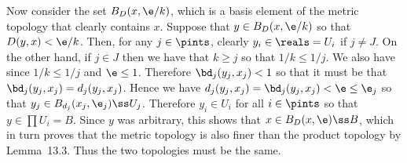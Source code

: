 {{    Now consider the set $B_D(x,\e/k)$, which is a basis element of the metric topology that clearly contains $x$.
    Suppose that $y \in B_D(x,\e/k)$ so that $D(y,x) < \e/k$.
    Then, for any $j \in \pints$, clearly $y_i \in \reals = U_i$ if $j \neq J$.
    On the other hand, if $j \in J$ then we have that $k \geq j$ so that $1/k \leq 1/j$.
    We also have
    since $1/k \leq 1/j$ and $\e \leq 1$.
    Therefore $\bd_j(y_j,x_j) < 1$ so that it must be that $\bd_j(y_j,x_j) = d_j(y_j,x_j)$.
    Hence we have $d_j(y_j,x_j) = \bd_j(y_j,x_j) < \e \leq \e_j$ so that $y_j \in B_{d_j}(x_j,\e_j) \ss U_j$.
    Therefore $y_i \in U_i$ for all $i \in \pints$ so that $y \in \prod U_i = B$.
    Since $y$ was arbitrary, this shows that $x \in B_D(x,\e) \ss B$, which in turn proves that the metric topology is also finer than the product topology by Lemma~13.3.
    Thus the two topologies must be the same.
  }
}
